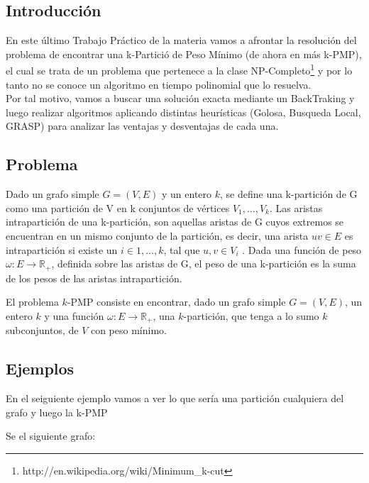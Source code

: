 \subsection{Introducci\'on}
En este \'ultimo Trabajo Pr\'actico de la materia vamos a afrontar la resoluci\'on del problema de encontrar una k-Partici\'o de Peso M\'inimo (de ahora en m\'as k-PMP), el cual se trata de un problema que pertenece a la clase NP-Completo\footnote{http://en.wikipedia.org/wiki/Minimum\_k-cut} y por lo tanto no se conoce un algoritmo en tiempo polinomial que lo resuelva.\\
Por tal motivo, vamos a buscar una soluci\'on exacta mediante un BackTraking y luego realizar algoritmos aplicando distintas heur\'isticas (Golosa, Busqueda Local, GRASP) para analizar las ventajas y desventajas de cada una.

\subsection{Problema}

Dado un grafo simple $G = (V, E)$ y un entero $k$, se define una k-partici\'on de G como una partici\'on de V en k conjuntos de v\'ertices $V_{1} , \ldots , V_{k}$. Las aristas intrapartici\'on de una k-partici\'on, son aquellas aristas de G cuyos extremos se encuentran en un mismo conjunto de la partici\'on, es decir, una arista $uv \in E$ es intrapartici\'on si existe un $i \in {1, \ldots , k}$, tal que $u, v \in V_{i}$ . Dada una función de peso $\omega : E \rightarrow \mathbb{R}_+$, definida sobre las aristas de G, el peso de una k-partici\'on es la suma de los pesos de las aristas intrapartici\'on.

El problema $k$-PMP consiste en encontrar, dado un grafo simple $G = (V, E)$, un entero $k$ y una función $\omega : E \rightarrow \mathbb{R}_+$, una $k$-partición, que tenga a lo sumo $k$ subconjuntos, de $V$ con peso mínimo.

\subsection{Ejemplos}
En el seiguiente ejemplo vamos a ver lo que ser\'ia una partici\'on cualquiera del grafo y luego la k-PMP

Se el siguiente grafo: 

